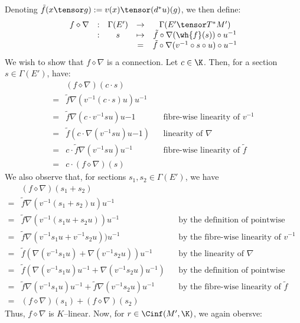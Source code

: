 \documentclass[\PRJWD/Thick_TQFTs_and_Quantum_Information.tex]{subfiles}
\begin{document}
Denoting $\tilde{f}(x \tensor g) := v(x) \tensor (d^*u)(g)$, we then define:
\[\begin{array}{ccccc}
f \diamond \nabla
&:& \Gamma(E') &\to    & \Gamma(E' \tensor T^*M') \\
&:& s &\mapsto& \tilde{f} \circ \nabla(\wh{f}(s)) \circ u^{-1} \\
&&& = &
  \tilde{f} \circ \nabla(v^{-1} \circ s \circ u) \circ u^{-1}
\end{array}\]
We wish to show that $f \diamond \nabla$ is a connection.
Let $c \in \K$. Then, for a section $s \in \Gamma(E')$, have:
\begin{align*}
   & (f \diamond \nabla)(c \cdot s) \\
  =& \tilde{f}\nabla(v^{-1}(c \cdot s)u)u^{-1} \\
  =& \tilde{f}\nabla(c \cdot v^{-1}su)u{-1}
      && \text{fibre-wise linearity of } v^{-1} \\
  =& \tilde{f} (c \cdot  \nabla(v^{-1}su)u{-1})
      && \text{linearity of } \nabla \\
  =& c \cdot \tilde{f}\nabla(v^{-1}su)u^{-1}
      && \text{fibre-wise linearity of } \tilde{f} \\
  =& c \cdot (f \diamond \nabla)(s)
\end{align*}
We also observe that, for sections $s_1, s_2 \in \Gamma(E')$, we have
\begin{align*}
   & (f \diamond \nabla)(s_1 + s_2)\\
  =& \tilde{f}\nabla(v^{-1}(s_1 + s_2)u)u^{-1} \\
  =& \tilde{f}\nabla(v^{-1}(s_1u + s_2u))u^{-1}
    && \text{by the definition of pointwise addition} \\
  =& \tilde{f}\nabla(v^{-1}s_1u + v^{-1}s_2u))u^{-1}
    && \text{by the fibre-wise linearity of } v^{-1} \\
  =& \tilde{f}(\nabla(v^{-1}s_1u)
    + \nabla(v^{-1}s_2u))u^{-1}
    && \text{by the linearity of } \nabla \\
  =& \tilde{f}(\nabla(v^{-1}s_1u)u^{-1}
    + \nabla(v^{-1}s_2u)u^{-1})
    && \text{by the definition of pointwise addition} \\
  =& \tilde{f}\nabla(v^{-1}s_1u)u^{-1}
    + \tilde{f}\nabla(v^{-1}s_2u)u^{-1}
    && \text{by the fibre-wise linearity of } \tilde{f} \\
  =& (f \diamond \nabla)(s_1) + (f \diamond \nabla)(s_2)
\end{align*}
Thus, $f \diamond \nabla$ is $K$--linear. Now, for $r \in \Cinf(M', \K)$, we
again obersve:
\end{document}
